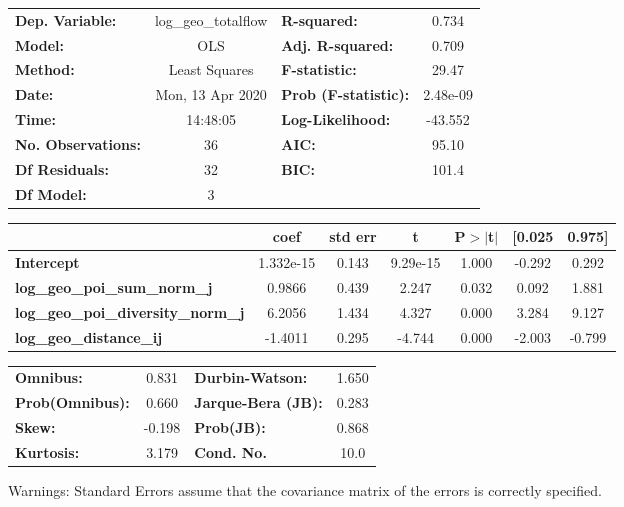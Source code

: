 \begin{center}
\begin{tabular}{lclc}
\toprule
\textbf{Dep. Variable:}                    & log\_geo\_totalflow & \textbf{  R-squared:         } &     0.734   \\
\textbf{Model:}                            &         OLS         & \textbf{  Adj. R-squared:    } &     0.709   \\
\textbf{Method:}                           &    Least Squares    & \textbf{  F-statistic:       } &     29.47   \\
\textbf{Date:}                             &   Mon, 13 Apr 2020  & \textbf{  Prob (F-statistic):} &  2.48e-09   \\
\textbf{Time:}                             &       14:48:05      & \textbf{  Log-Likelihood:    } &   -43.552   \\
\textbf{No. Observations:}                 &            36       & \textbf{  AIC:               } &     95.10   \\
\textbf{Df Residuals:}                     &            32       & \textbf{  BIC:               } &     101.4   \\
\textbf{Df Model:}                         &             3       & \textbf{                     } &             \\
\bottomrule
\end{tabular}
\begin{tabular}{lcccccc}
                                           & \textbf{coef} & \textbf{std err} & \textbf{t} & \textbf{P$> |$t$|$} & \textbf{[0.025} & \textbf{0.975]}  \\
\midrule
\textbf{Intercept}                         &    1.332e-15  &        0.143     &  9.29e-15  &         1.000        &       -0.292    &        0.292     \\
\textbf{log\_geo\_poi\_sum\_norm\_j}       &       0.9866  &        0.439     &     2.247  &         0.032        &        0.092    &        1.881     \\
\textbf{log\_geo\_poi\_diversity\_norm\_j} &       6.2056  &        1.434     &     4.327  &         0.000        &        3.284    &        9.127     \\
\textbf{log\_geo\_distance\_ij}            &      -1.4011  &        0.295     &    -4.744  &         0.000        &       -2.003    &       -0.799     \\
\bottomrule
\end{tabular}
\begin{tabular}{lclc}
\textbf{Omnibus:}       &  0.831 & \textbf{  Durbin-Watson:     } &    1.650  \\
\textbf{Prob(Omnibus):} &  0.660 & \textbf{  Jarque-Bera (JB):  } &    0.283  \\
\textbf{Skew:}          & -0.198 & \textbf{  Prob(JB):          } &    0.868  \\
\textbf{Kurtosis:}      &  3.179 & \textbf{  Cond. No.          } &     10.0  \\
\bottomrule
\end{tabular}
\end{center}

Warnings: \newline
 [1] Standard Errors assume that the covariance matrix of the errors is correctly specified.